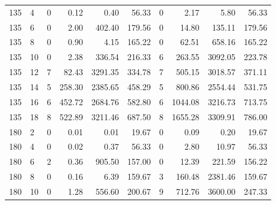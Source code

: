 \begin{appendices}
\begin{table*}[h]
\begin{center}
\begin{tabular} {l l | r r r r | r r r r}
135 & 4                                &  0              &  0.12         &  0.40          &  56.33      &  0          &  2.17         &  5.80       &  56.33        \\ 
135 & 6                                &  0              &  2.00         &  402.40        &  179.56     &  0          &  14.80        &  135.11     &  179.56       \\ 
135 & 8                                &  0              &  0.90         &  4.15          &  165.22     &  0          &  62.51        &  658.16     &  165.22       \\ 
135 & 10                               &  0              &  2.38         &  336.54        &  216.33     &  6          &  263.55       &  3092.05    &  223.78       \\ 
135 & 12                               &  7              &  82.43        &  3291.35       &  334.78     &  7          &  505.15       &  3018.57    &  371.11       \\ 
135 & 14                               &  5              &  258.30       &  2385.65       &  458.29     &  5          &  800.86       &  2554.44    &  531.75       \\ 
135 & 16                               &  6              &  452.72       &  2684.76       &  582.80     &  6          &  1044.08      &  3216.73    &  713.75       \\ 
135 & 18                               &  8              &  522.89       &  3211.46       &  687.50     &  8          &  1655.28      &  3309.91    &  786.00       \\ 
180 & 2                                &  0              &  0.01         &  0.01          &  19.67      &  0          &  0.09         &  0.20       &  19.67        \\ 
180 & 4                                &  0              &  0.02         &  0.37          &  56.33      &  0          &  2.80         &  10.97      &  56.33        \\ 
180 & 6                                &  2              &  0.36         &  905.50        &  157.00     &  0          &  12.39        &  221.59     &  156.22       \\ 
180 & 8                                &  0              &  0.16         &  6.39          &  159.67     &  3          &  160.48       &  2381.46    &  159.67       \\ 
180 & 10                               &  0              &  1.28         &  556.60        &  200.67     &  9          &  712.76       &  3600.00    &  247.33       \\ 

\end{tabular}
\end{center}
\end{table*}
\end{appendices}

